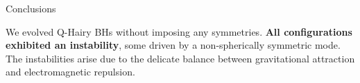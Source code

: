 \begin{block}{Conclusions}

We evolved Q-Hairy \glspl{BH} without imposing any symmetries. \textbf{All configurations exhibited an instability}, some driven by a non-spherically symmetric mode. The instabilities arise due to the delicate balance between gravitational attraction and electromagnetic repulsion.

\end{block}
